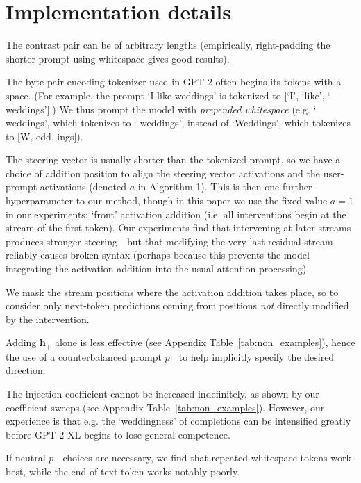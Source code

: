 \section{Implementation details} 
\label{sec:app_imp}

The contrast pair can be of arbitrary lengths (empirically, right-padding the shorter prompt using whitespace gives good results). 

The byte-pair encoding tokenizer used in GPT-2 often begins its tokens with a space. (For example, the prompt `I like weddings' is tokenized to [`I',  `like', ` weddings'].) We thus prompt the model with \textit{prepended whitespace} (e.g. ` weddings', which tokenizes to ` weddings', instead of `Weddings', which tokenizes to [W, edd, ings]).


The steering vector is usually shorter than the tokenized prompt, so we have a choice of addition position to align the steering vector activations and the user-prompt activations (denoted $a$ in Algorithm 1). This is then one further hyperparameter to our method, though in this paper we use the fixed value $a=1$ in our experiments: `front' activation addition (i.e. all interventions begin at the stream of the first token). Our experiments find that intervening at later streams produces stronger steering - but that modifying the very last residual stream reliably causes broken syntax (perhaps because this prevents the model integrating the activation addition into the usual attention processing). %

We mask the stream positions where the activation addition takes place, so to consider only next-token predictions coming from positions \textit{not} directly modified by the intervention.

Adding $\mathbf{h}_+$ alone is less effective (see Appendix Table~\ref{tab:non_examples}), hence the use of a counterbalanced prompt $p_-$ to help implicitly specify the desired direction.

The injection coefficient cannot be increased indefinitely, as shown by our coefficient sweeps (see Appendix Table~\ref{tab:non_examples}). However, our experience is that e.g. the `weddingness' of completions can be intensified greatly before GPT-2-XL begins to lose general competence. 

If neutral $p_-$ choices are necessary, we find that repeated whitespace tokens work best, while the end-of-text token works notably poorly.

